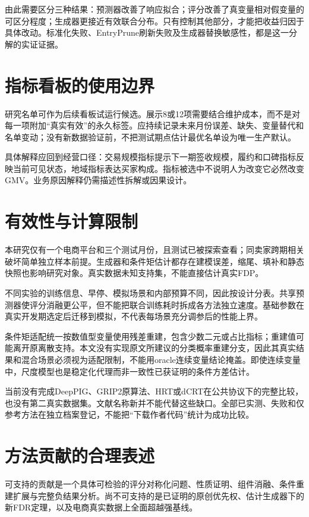 \documentclass{sufethesismas}
\begin{document}
由此需要区分三种结果：预测器改善了响应拟合；评分改善了真变量相对假变量的可区分程度；生成器更接近有效联合分布。只有控制其他部分，才能把收益归因于具体改动。标准化失败、EntryPrune刷新失败及生成器替换敏感性，都是这一分解的实证证据。

\section{指标看板的使用边界}

研究名单可作为后续看板试运行候选。展示8或12项需要结合维护成本，而不是对每一项附加``真实有效''的永久标签。应持续记录未来月份误差、缺失、变量替代和名单变动；没有新数据验证前，不把测试期点估计最优名单设为唯一生产默认。

具体解释应回到经营口径：交易规模指标提示下一期签收规模，履约和口碑指标反映当前可见状态，地域指标表达买家构成。指标被选中不说明人为改变它必然改变GMV。业务原因解释仍需描述性拆解或因果设计。

\section{有效性与计算限制}

本研究仅有一个电商平台和三个测试月份，且测试已被探索查看；同卖家跨期相关破坏简单独立样本前提。生成器和条件矩估计都存在建模误差，缩尾、填补和静态快照也影响研究对象。真实数据未知支持集，不能直接估计真实FDP。

不同实验的训练信息、早停、模拟场景和内部预算不同，因此按设计分表。共享预测器使评分消融更公平，但不能把联合训练耗时拆成各方法独立速度。基础参数在真实开发期选定后迁移到模拟，不代表每场景充分调参后的性能上界。

条件矩适配统一按数值型变量使用残差重建，包含少数二元或占比指标；重建值可能离开原离散支持。本文没有实现原文所建议的分类概率重建分支，因此其真实结果和混合场景必须视为适配限制，不能用oracle连续变量结论掩盖。即使连续变量中，尺度模型也是稳定化代理而非一致性已获证明的条件方差估计。

当前没有完成DeepPIG、GRIP2原算法、HRT或dCRT在公共协议下的完整比较，也没有第二真实数据集。文献名称新并不能代替这些缺口。全部已实测、失败和仅参考方法在独立档案登记，不能把``下载作者代码''统计为成功比较。

\section{方法贡献的合理表述}

可支持的贡献是一个具体可检验的评分对称化问题、性质证明、组件消融、条件重建扩展与完整负结果分析。尚不可支持的是已证明的原创优先权、估计生成器下的新FDR定理，以及电商真实数据上全面超越强基线。
\end{document}
